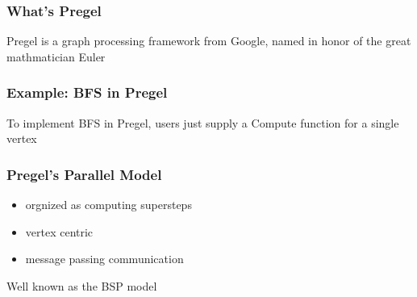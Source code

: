 \documentclass[]{beamer}
\begin{document}
\begin{frame}
  \frametitle{What's Pregel}
  Pregel is a graph processing framework from Google, named in honor of
  the great mathmatician Euler
\end{frame}

\begin{frame}
  \frametitle{Example: BFS in Pregel}
  To implement BFS in Pregel, users just supply a \alert{Compute} function for
  a single vertex
  
\end{frame}

\begin{frame}
  \frametitle{Pregel's Parallel Model}
  \begin{itemize}
    \item orgnized as computing supersteps
    \item vertex centric
    \item message passing communication
  \end{itemize}

  \pause
  Well known as the BSP model
\end{frame}
\end{document}
